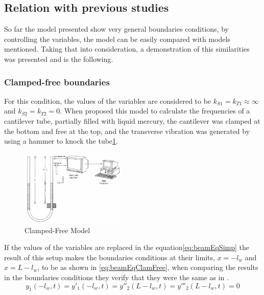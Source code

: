\subsection{Relation with previous studies}
So far the model presented show very general boundaries conditions, by controlling the variables, the model can be easily compared with models mentioned. Taking that into consideration, a demonstration of this similarities was presented and is the following.
    \subsubsection{Clamped-free boundaries}
    For this condition, the values of the variables are considered to be $k_{S1}=k_{T1}\approx\infty$ and $k_{S2}=k_{T2}=0$. When \citeauthor{chanFreeVibrationCantilever1995} proposed this model to calculate the frequencies of a cantilever tube, partially filled with liquid mercury, the cantilever was clamped at the bottom and free at the top, and the transverse vibration was generated by using a hammer to knock the tube\ref{fig:clampedfreemodel}. 
    \begin{figure}[!htb]
        \centering
        \includegraphics[width=0.45\textwidth]{Chapters/2CHP/Diagrams/clampedfreemodel.pdf}
        \caption{Clamped-Free Model \cite{chanFreeVibrationCantilever1995}}
        \label{fig:clampedfreemodel}
    \end{figure}
    If the values of the variables are replaced in the equation\ref{eq:beamEqSimp} the result of this setup makes the boundaries conditions at their limits, $x=-l_w$ and $x=L-l_w$, to be as shown in \ref{eq:beamEqClamFree}, when comparing the results in the boundaries conditions they verify that they were the same as in \cite{chanFreeVibrationCantilever1995}.
    \begin{equation} \label{eq:beamEqClamFree}
            y_1(-l_w,t) = y'_1(-l_w,t) = y''_2(L-l_w,t) = y'''_2(L-l_w,t)=0
    \end{equation}
